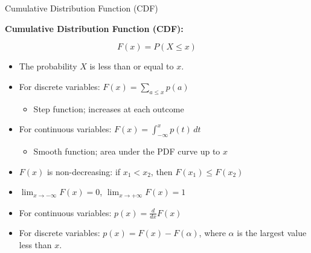 \documentclass{beamer}
\begin{document}
\begin{frame}{Cumulative Distribution Function (CDF)}

\textbf{Cumulative Distribution Function (CDF):}

\[
F(x) = P(X \leq x)
\]

\begin{itemize}
  \item The probability $X$ is less than or equal to $x$.
  \item For discrete variables: $F(x) = \sum_{a \leq x} p(a)$
    \begin{itemize}
    \item Step function; increases at each outcome
    \end{itemize}
  \item For continuous variables: $F(x) = \int_{-\infty}^{x} p(t) \, dt$
    \begin{itemize}
    \item Smooth function; area under the PDF curve up to $x$
    \end{itemize}
  \item $F(x)$ is non-decreasing: if $x_1 < x_2$, then $F(x_1) \leq F(x_2)$
  \item $\lim_{x \to -\infty} F(x) = 0$, $\lim_{x \to +\infty} F(x) = 1$
  \item For continuous variables: $\boxed{p(x) = \frac{d}{dx} F(x)}$
  \item For discrete variables: $p(x) = F(x) - F(\alpha)$, where $\alpha$ is the largest value less than $x$.
\end{itemize}

\end{frame}
\end{document}
